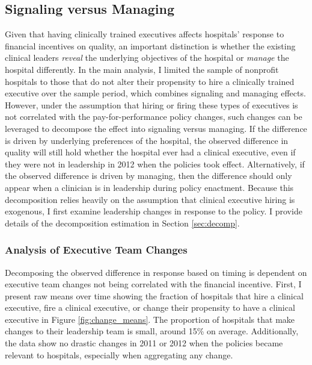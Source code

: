 \documentclass[12pt]{article}
\begin{document}
    \subsection{Signaling versus Managing}\label{sec:sig_man}

    Given that having clinically trained executives affects hospitals' response to financial incentives on quality, an important distinction is whether the existing clinical leaders \textit{reveal} the underlying objectives of the hospital or \textit{manage} the hospital differently. In the main analysis, I limited the sample of nonprofit hospitals to those that do not alter their propensity to hire a clinically trained executive over the sample period, which combines signaling and managing effects. However, under the assumption that hiring or firing these types of executives is not correlated with the pay-for-performance policy changes, such changes can be leveraged to decompose the effect into signaling versus managing. If the difference is driven by underlying preferences of the hospital, the observed difference in quality will still hold whether the hospital ever had a clinical executive, even if they were not in leadership in 2012 when the policies took effect. Alternatively, if the observed difference is driven by managing, then the difference should only appear when a clinician is in leadership during policy enactment. Because this decomposition relies heavily on the assumption that clinical executive hiring is exogenous, I first examine leadership changes in response to the policy. I provide details of the decomposition estimation in Section \ref{sec:decomp}.

    \subsubsection{Analysis of Executive Team Changes} \label{sec:changes}

    Decomposing the observed difference in response based on timing is dependent on executive team changes not being correlated with the financial incentive. First, I present raw means over time showing the fraction of hospitals that hire a clinical executive, fire a clinical executive, or change their propensity to have a clinical executive in Figure \ref{fig:change_means}. The proportion of hospitals that make changes to their leadership team is small, around 15\% on average. Additionally, the data show no drastic changes in 2011 or 2012 when the policies became relevant to hospitals, especially when aggregating any change. 
\end{document}
